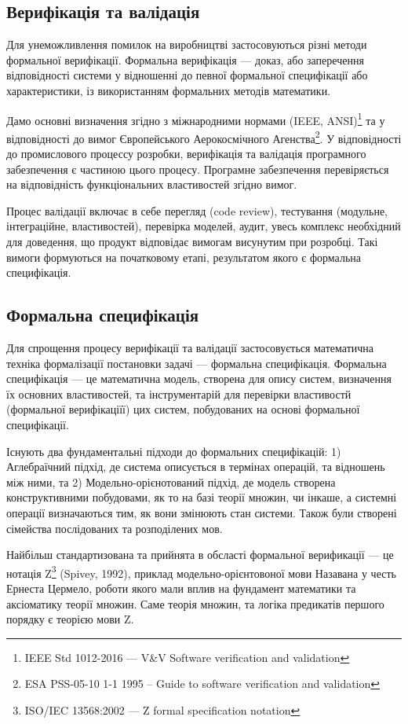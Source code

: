 \documentclass{article}
\begin{document}
\subsection{Верифікація та валідація}
Для унеможливлення помилок на виробництві застосовуються різні
методи формальної верифікації. Формальна верифікація — доказ, або заперечення
відповідності системи у відношенні до певної формальної специфікації або характеристики,
із використанням формальних методів математики.

Дамо основні визначення згідно з міжнародними нормами (IEEE, ANSI)\footnote{IEEE Std 1012-2016  --- V\&V Software verification and validation} та у відповідності до вимог
Європейського Аерокосмічного Агенства\footnote{ESA PSS-05-10 1-1 1995 -- Guide to software verification and validation}.
У відповідності до промислового процессу розробки, верифікація та валідація програмного
забезпечення є частиною цього процесу. Програмне забезпечення перевіряється на
відповідність функціональних властивостей згідно вимог.

Процес валідації включає в себе перегляд (code review),
тестування (модульне, інтеграційне, властивостей), перевірка моделей, аудит,
увесь комплекс необхідний для доведення, що продукт відповідає вимогам
висунутим при розробці. Такі вимоги формуються на початковому етапі,
результатом якого є формальна специфікація.

\subsection{Формальна специфікація}
Для спрощення процесу верифікації та валідації
застосовується математична техніка формалізації постановки задачі --- формальна специфікація.
Формальна специфікація --- це математична модель, створена для опису систем,
визначення їх основних властивостей, та інструментарій для перевірки
властивостй (формальної верифікаціїї) цих систем, побудованих на основі формальної специфікації.

Існують два фундаментальні підходи до формальних специфікацій: 1) Аглебраїчний підхід, де
система описується в термінах операцій, та відношень між ними, та
2) Модельно-орієнотований підхід, де модель створена конструктивними побудовами,
як то на базі теорії множин, чи інкаше, а системні операції визначаються тим, як вони змінюють
стан системи. Також були створені сімейства послідованих та розподілених мов.

Найбільш стандартизована та прийнята в обсласті формальної верификації --- це нотація
Z\footnote{ISO/IEC 13568:2002 --- Z formal specification notation} (Spivey, 1992), приклад
модельно-орієнтовоної мови
Назавана у честь Ернеста Цермело, роботи якого мали вплив на фундамент математики та аксіоматику
теорії множин. Саме теорія множин, та логіка предикатів першого порядку є теорією мови Z.
\end{document}
